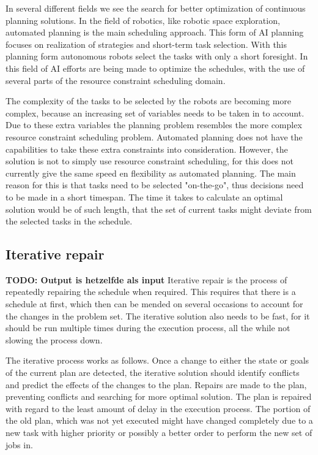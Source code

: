 \documentclass{article}
\newcommand{\TODO}[1]{{\color{red}\textbf{TODO: #1}}}
\begin{document}
In several different fields we see the search for better optimization of continuous planning solutions.
In the field of robotics, like robotic space exploration, automated planning is the main scheduling approach.
This form of AI planning focuses on realization of strategies and short-term task selection.
With this planning form autonomous robots select the tasks with only a short foresight.
In this field of AI efforts are being made to optimize the schedules, with the use of several parts of the resource constraint scheduling domain.
\cite{smith00}

The complexity of the tasks to be selected by the robots are becoming more complex, because an increasing set of variables needs to be taken in to account.
Due to these extra variables the planning problem resembles the more complex resource constraint scheduling problem.
Automated planning does not have the capabilities to take these extra constraints into consideration.
However, the solution is not to simply use resource constraint scheduling, for this does not currently give the same speed en flexibility as automated planning.
The main reason for this is that tasks need to be selected "on-the-go", thus decisions need to be made in a short timespan.
The time it takes to calculate an optimal solution would be of such length, that the set of current tasks might deviate from the selected tasks in the schedule.

\subsection{Iterative repair}
\TODO{Output is hetzelfde als input}
Iterative repair is the process of repeatedly repairing the schedule when required.
This requires that there is a schedule at first, which then can be mended on several occasions to account for the changes in the problem set.
The iterative solution also needs to be fast, for it should be run multiple times during the execution process, all the while not slowing the process down.

The iterative process works as follows.
Once a change to either the state or goals of the current plan are detected, the iterative solution should identify conflicts and predict the effects of the changes to the plan.
Repairs are made to the plan, preventing conflicts and searching for more optimal solution.
The plan is repaired with regard to the least amount of delay in the execution process.
The portion of the old plan, which was not yet executed might have changed completely due to a new task with higher priority or possibly a better order to perform the new set of jobs in.
\cite{chien00}
\end{document}
